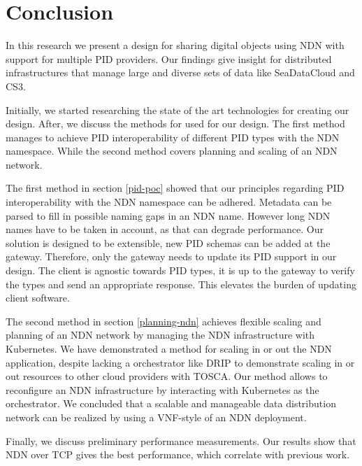 \section{Conclusion}\label{conc}
In this research we present a design for sharing digital objects using NDN with support for multiple PID providers. Our findings give insight for distributed infrastructures that manage large and diverse sets of data like SeaDataCloud and CS3. 

Initially, we started researching the state of the art technologies for creating our design. After, we discuss the methods for used for our design. The first method manages to achieve PID interoperability of different PID types with the NDN namespace. While the second method covers planning and scaling of an NDN network. 

The first method in section \ref{pid-poc} showed that our principles regarding PID interoperability with the NDN namespace can be adhered. Metadata can be parsed to fill in possible naming gaps in an NDN name. However long NDN names have to be taken in account, as that can degrade performance. 
Our solution is designed to be extensible, new PID schemas can be added at the gateway. Therefore, only the gateway needs to update its PID support in our design. The client is agnostic towards PID types, it is up to the gateway to verify the types and send an appropriate response. This elevates the burden of updating client software.

The second method in section \ref{planning-ndn} achieves flexible scaling and planning of an NDN network by managing the NDN infrastructure with Kubernetes. We have demonstrated a method for scaling in or out the NDN application, despite lacking a orchestrator like DRIP to demonstrate scaling in or out resources to other cloud providers with TOSCA. Our method allows to reconfigure an NDN infrastructure 
by interacting with Kubernetes as the orchestrator.
We concluded that a scalable and manageable data distribution network can be realized by using a VNF-style of an NDN deployment. 

Finally, we discuss preliminary performance measurements. Our results show that NDN over TCP gives the best performance, which correlate with previous work.

